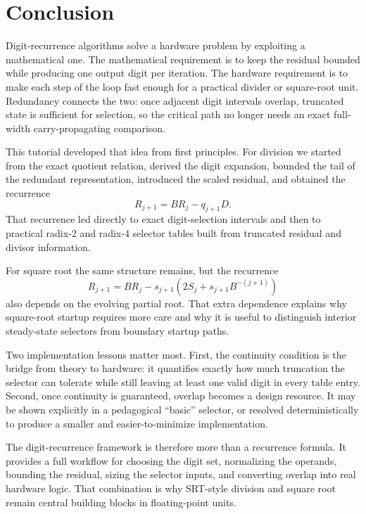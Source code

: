 \documentclass[11pt]{article}
\numberwithin{equation}{section}
\begin{document}
\clearpage

\section{Conclusion}
\label{sec:conclusion}

Digit-recurrence algorithms solve a hardware problem by exploiting a mathematical one.
The mathematical requirement is to keep the residual bounded while producing one output digit per
iteration.
The hardware requirement is to make each step of the loop fast enough for a practical divider or
square-root unit.
Redundancy connects the two: once adjacent digit intervals overlap, truncated state is sufficient
for selection, so the critical path no longer needs an exact full-width carry-propagating
comparison.

This tutorial developed that idea from first principles.
For division we started from the exact quotient relation, derived the digit expansion, bounded the
tail of the redundant representation, introduced the scaled residual, and obtained the recurrence
\[
  R_{j+1} = BR_j - q_{j+1}D.
\]
That recurrence led directly to exact digit-selection intervals and then to practical radix-2 and
radix-4 selector tables built from truncated residual and divisor information.

For square root the same structure remains, but the recurrence
\[
  R_{j+1} = BR_j - s_{j+1}\left(2S_j + s_{j+1}B^{-(j+1)}\right)
\]
also depends on the evolving partial root.
That extra dependence explains why square-root startup requires more care and why it is useful to
distinguish interior steady-state selectors from boundary startup paths.

Two implementation lessons matter most.
First, the continuity condition is the bridge from theory to hardware: it quantifies exactly how
much truncation the selector can tolerate while still leaving at least one valid digit in every
table entry.
Second, once continuity is guaranteed, overlap becomes a design resource.
It may be shown explicitly in a pedagogical ``basic'' selector, or resolved deterministically to
produce a smaller and easier-to-minimize implementation.

The digit-recurrence framework is therefore more than a recurrence formula.
It provides a full workflow for choosing the digit set, normalizing the operands, bounding the
residual, sizing the selector inputs, and converting overlap into real hardware logic.
That combination is why SRT-style division and square root remain central building blocks in
floating-point units.
\end{document}
